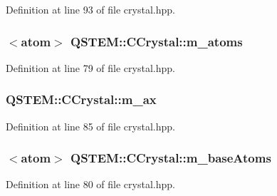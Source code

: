 Definition at line 93 of file crystal.\-hpp.

\hypertarget{class_q_s_t_e_m_1_1_c_crystal_a11c880edf1e4ce280ac5e5e40b8b8725}{
\subsubsection[{m\-\_\-atoms}]{$<${\bf atom}$>$ Q\-S\-T\-E\-M\-::\-C\-Crystal\-::m\-\_\-atoms\hspace{0.3cm}{\ttfamily [protected]}}}\label{class_q_s_t_e_m_1_1_c_crystal_a11c880edf1e4ce280ac5e5e40b8b8725}


Definition at line 79 of file crystal.\-hpp.

\hypertarget{class_q_s_t_e_m_1_1_c_crystal_a8a8ffd6263ae0ba3c7a13b386ccc281a}{
\subsubsection[{m\-\_\-ax}]{ Q\-S\-T\-E\-M\-::\-C\-Crystal\-::m\-\_\-ax\hspace{0.3cm}{\ttfamily [protected]}}}\label{class_q_s_t_e_m_1_1_c_crystal_a8a8ffd6263ae0ba3c7a13b386ccc281a}


Definition at line 85 of file crystal.\-hpp.

\hypertarget{class_q_s_t_e_m_1_1_c_crystal_a55d5a0d10fea215805abdb176b4accf9}{
\subsubsection[{m\-\_\-base\-Atoms}]{$<${\bf atom}$>$ Q\-S\-T\-E\-M\-::\-C\-Crystal\-::m\-\_\-base\-Atoms\hspace{0.3cm}{\ttfamily [protected]}}}\label{class_q_s_t_e_m_1_1_c_crystal_a55d5a0d10fea215805abdb176b4accf9}


Definition at line 80 of file crystal.\-hpp.


